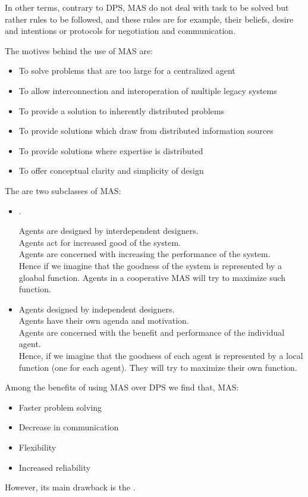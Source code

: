 In other terms, contrary to DPS, MAS do not deal with task to be solved but rather rules to be followed, and these rules are for example, their beliefs, desire and intentions or protocols for negotiation and communication.

The motives behind the use of MAS are:
\begin{itemize}
\item To solve problems that are too large for a centralized agent
\item To allow interconnection and interoperation of multiple legacy systems
\item To provide a solution to inherently distributed problems
\item To provide solutions which draw from distributed information sources
\item To provide solutions where expertise is distributed
\item To offer conceptual clarity and simplicity of design
\end{itemize}

The are two subclasses of MAS:
\begin{itemize}
\item {}.

Agents are designed by interdependent designers.\\
Agents act for increased good of the system.\\
Agents are concerned with increasing the performance of the system.\\

Hence if we imagine that the goodness of the system is represented by a gloabal function. Agents in a cooperative MAS will try to maximize such function.
\item {}

Agents designed by independent designers.\\
Agents have their own agenda and motivation.\\
Agents are concerned with the benefit and performance of the individual agent.\\

Hence, if we imagine that the goodness of each agent is represented by a local function (one for each agent). They will try to maximize their own function.	
\end{itemize}

Among the benefits of using MAS over DPS we find that, MAS:
\begin{itemize}
\item  Faster problem solving
\item Decrease in communication
\item  Flexibility
\item Increased reliability
\end{itemize}
However, its main drawback is the .

